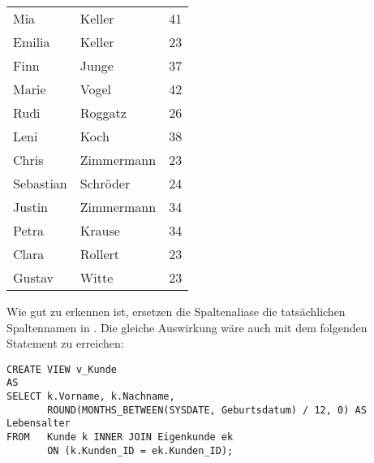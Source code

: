         \begin{center}
          \begin{small}
            \tablehead{}

            \begin{oraclesql}
              \begin{supertabular}{llr}
                Mia & Keller & 41 \\
                Emilia & Keller & 23 \\
                Finn & Junge & 37 \\
                Marie & Vogel & 42 \\
                Rudi & Roggatz & 26 \\
                Leni & Koch & 38 \\
                Chris & Zimmermann & 23 \\
                Sebastian & Schröder & 24 \\
                Justin & Zimmermann & 34 \\
                Petra & Krause & 34 \\
                Clara & Rollert & 23 \\
                Gustav & Witte & 23 \\
              \end{supertabular}
            \end{oraclesql}
          \end{small}
        \end{center}
        Wie gut zu erkennen ist, ersetzen die Spaltenaliase die tatsächlichen Spaltennamen in . Die gleiche Auswirkung wäre auch mit dem folgenden Statement zu erreichen:
        \begin{lstlisting}[language=oracle_sql,caption={Eine einfache View mit Spaltenaliasen},label=sql08_30]
CREATE VIEW v_Kunde
AS
SELECT k.Vorname, k.Nachname,
       ROUND(MONTHS_BETWEEN(SYSDATE, Geburtsdatum) / 12, 0) AS Lebensalter
FROM   Kunde k INNER JOIN Eigenkunde ek
       ON (k.Kunden_ID = ek.Kunden_ID);
        \end{lstlisting}
